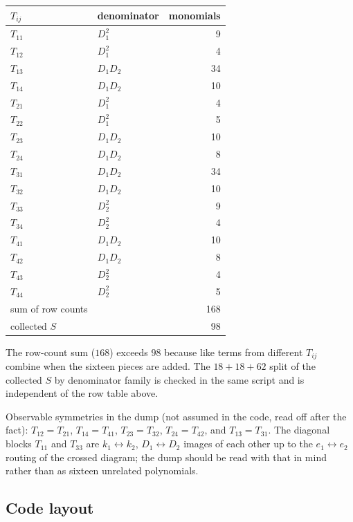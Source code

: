 \documentclass[11pt]{article}
\begin{document}
\begin{center}
\begin{tabular}{@{}llr@{}}
\toprule
$T_{ij}$ & denominator & monomials \\
\midrule
$T_{11}$ & $D_1^2$     & 9 \\
$T_{12}$ & $D_1^2$     & 4 \\
$T_{13}$ & $D_1 D_2$  & 34 \\
$T_{14}$ & $D_1 D_2$  & 10 \\
$T_{21}$ & $D_1^2$     & 4 \\
$T_{22}$ & $D_1^2$     & 5 \\
$T_{23}$ & $D_1 D_2$  & 10 \\
$T_{24}$ & $D_1 D_2$  & 8 \\
$T_{31}$ & $D_1 D_2$  & 34 \\
$T_{32}$ & $D_1 D_2$  & 10 \\
$T_{33}$ & $D_2^2$     & 9 \\
$T_{34}$ & $D_2^2$     & 4 \\
$T_{41}$ & $D_1 D_2$  & 10 \\
$T_{42}$ & $D_1 D_2$  & 8 \\
$T_{43}$ & $D_2^2$     & 4 \\
$T_{44}$ & $D_2^2$     & 5 \\
\midrule
sum of row counts & & 168 \\
collected $S$     & & 98 \\
\bottomrule
\end{tabular}
\end{center}

The row-count sum ($168$) exceeds $98$ because like terms from different
$T_{ij}$ combine when the sixteen pieces are added. The $18+18+62$ split
of the collected $S$ by denominator family is checked in the same script
and is independent of the row table above.

Observable symmetries in the dump (not assumed in the code, read off
after the fact): $T_{12}=T_{21}$, $T_{14}=T_{41}$, $T_{23}=T_{32}$,
$T_{24}=T_{42}$, and $T_{13}=T_{31}$. The diagonal blocks $T_{11}$ and
$T_{33}$ are $k_1\leftrightarrow k_2$, $D_1\leftrightarrow D_2$ images of
each other up to the $e_1\leftrightarrow e_2$ routing of the crossed
diagram; the dump should be read with that in mind rather than as sixteen
unrelated polynomials.

\subsection{Code layout}
\label{app:code}
\end{document}
